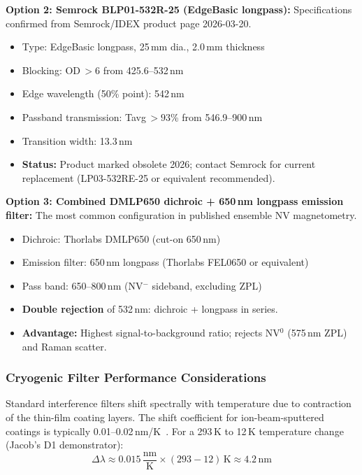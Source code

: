 \textbf{Option 2: Semrock BLP01-532R-25 (EdgeBasic longpass):}
Specifications confirmed from Semrock/IDEX product page 2026-03-20.\cite{SemrockBLP01_web}
\begin{itemize}
  \item Type: EdgeBasic longpass, 25\,mm dia., 2.0\,mm thickness
  \item Blocking: OD\,$> 6$ from 425.6--532\,nm \cite{SemrockBLP01_web}
  \item Edge wavelength (50\% point): 542\,nm \cite{SemrockBLP01_web}
  \item Passband transmission: Tavg\,$> 93$\% from 546.9--900\,nm \cite{SemrockBLP01_web}
  \item Transition width: 13.3\,nm \cite{SemrockBLP01_web}
  \item \textbf{Status:} Product marked obsolete 2026; contact Semrock
    for current replacement (LP03-532RE-25 or equivalent recommended).
\end{itemize}

\textbf{Option 3: Combined DMLP650 dichroic + 650\,nm longpass emission filter:}
The most common configuration in published ensemble NV magnetometry.\cite{Barry2020}
\begin{itemize}
  \item Dichroic: Thorlabs DMLP650 (cut-on 650\,nm) \cite{ThorlabsDMLP650_web}
  \item Emission filter: 650\,nm longpass (Thorlabs FEL0650 or equivalent)
  \item Pass band: 650--800\,nm (NV$^-$ sideband, excluding ZPL)
  \item \textbf{Double rejection} of 532\,nm: dichroic + longpass in series.
  \item \textbf{Advantage:} Highest signal-to-background ratio; rejects
    NV$^0$ (575\,nm ZPL) and Raman scatter.\cite{Barry2020}
\end{itemize}

\subsubsection{Cryogenic Filter Performance Considerations}

Standard interference filters shift spectrally with temperature due to
contraction of the thin-film coating layers. The shift coefficient for
ion-beam-sputtered coatings is typically 0.01--0.02\,nm/K~\cite{AlluxtOpticalFilterThermalShift2026}.
For a 293\,K to 12\,K temperature change (Jacob's D1 demonstrator):
\begin{equation}
  \Delta\lambda \approx 0.015\,\frac{\text{nm}}{\text{K}} \times (293 - 12)\,\text{K}
    \approx 4.2\,\text{nm}
  \label{eq:oq4_filter_shift}
\end{equation}

